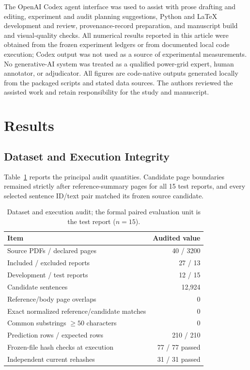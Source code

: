 \documentclass[applsci,article,submit,moreauthors]{Definitions/mdpi}
\begin{document}
The OpenAI Codex agent interface was used to assist with prose drafting and editing, experiment and audit planning suggestions, Python and \LaTeX{} development and review, provenance-record preparation, and manuscript build and visual-quality checks. All numerical results reported in this article were obtained from the frozen experiment ledgers or from documented local code execution; Codex output was not used as a source of experimental measurements. No generative-AI system was treated as a qualified power-grid expert, human annotator, or adjudicator. All figures are code-native outputs generated locally from the packaged scripts and stated data sources. The authors reviewed the assisted work and retain responsibility for the study and manuscript.

\section{Results}

\subsection{Dataset and Execution Integrity}

Table~\ref{tab:audit} reports the principal audit quantities. Candidate page boundaries remained strictly after reference-summary pages for all 15 test reports, and every selected sentence ID/text pair matched its frozen source candidate.

\begin{table}[H]
\caption{Dataset and execution audit; the formal paired evaluation unit is the test report ($n=15$).}
\label{tab:audit}\centering
\begin{tabular}{lr}
\toprule
Item & Audited value\\
\midrule
Source PDFs / declared pages & 40 / 3200\\
Included / excluded reports & 27 / 13\\
Development / test reports & 12 / 15\\
Candidate sentences & 12,924\\
Reference/body page overlaps & 0\\
Exact normalized reference/candidate matches & 0\\
Common substrings $\geq50$ characters & 0\\
Prediction rows / expected rows & 210 / 210\\
Frozen-file hash checks at execution & 77 / 77 passed\\
Independent current rehashes & 31 / 31 passed\\
\bottomrule
\end{tabular}
\end{table}
\end{document}
